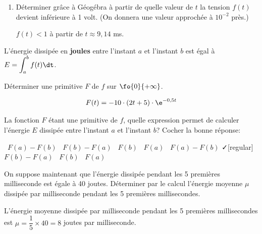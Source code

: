 \medskip


\begin{enumerate}[series=monDS, resume]
     
   \item Déterminer grâce à Géogébra à partir de quelle valeur de $t$ la tension $f(t)$ devient inférieure à 1 volt. (On donnera une valeur approchée à $10^{-2}$ près.)
    \begin{blocvisiblex}[height=1]
    {\quad}
    $f(t)<1$ à partir de $t\approx 9,14$ ms.
    \end{blocvisiblex}
\end{enumerate}

L'énergie dissipée en \textbf{joules} entre l'instant $a$ et l'instant $b$ est égal à $E=\displaystyle \int_{a}^{b} f(t) \dt$.

\begin{enumerate}[series=monDS, resume]
    \begin{minipage}{0.46\textwidth}
            \item Déterminer une primitive $F$ de $f$ sur $\fo{0}{+\infty}$.
    \end{minipage}\hfill{}
    \begin{minipage}{0.46\textwidth}
        \begin{blocvisiblex}[height=1.2]
    {\quad}

    \[F(t)=-10\cdot (2t+5)\cdot \e^{-0,5t}\]
    \end{blocvisiblex}
    \end{minipage}
    
    \medskip

    \item La fonction $F$ étant une primitive de $f$, quelle expression permet de calculer l'énergie $E$ dissipée entre l'instant $a$ et l'instant $b$? Cocher la bonne réponse:
   \begin{blocvisiblex}[height=1]
    {
    \faSquare[regular] \, $F(a) - F(b)$ \hfill \faSquare[regular] \, $F(b) - F(a)$ \hfill \faSquare[regular] \, $F(b)$ \hfill \faSquare[regular] \, $F(a)$ \hspace{1cm} 
 }         
    \faSquare[regular] \, $F(a) - F(b)$ \hfill \faCheck[regular] \, $F(b) - F(a)$ \hfill \faSquare[regular] \, $F(b)$ \hfill \faSquare[regular] \, $F(a)$ \hspace{1cm} 
    \end{blocvisiblex}
    \medskip
\item On suppose maintenant que l'énergie dissipée pendant les 5 premières milliseconde est égale à 40 joutes. Déterminer par le calcul l'énergie moyenne $\mu$ dissipée par milliseconde pendant les 5 premières millisecondes.
    \begin{blocvisiblex}[height=3]
    {\quad}
    L'énergie moyenne dissipée par milliseconde pendant les 5 premières millisecondes est $\mu=\dfrac{1}{5} \times 40=8$ joutes par milliseconde.
    \end{blocvisiblex}
    \medskip
    
\end{enumerate}
    

